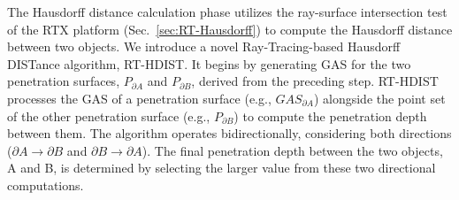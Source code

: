 The Hausdorff distance calculation phase utilizes the ray-surface intersection test of the RTX platform (Sec.~\ref{sec:RT-Hausdorff}) to compute the Hausdorff distance between two objects.
We introduce a novel Ray-Tracing-based Hausdorff DISTance algorithm, RT-HDIST.
It begins by generating GAS for the two penetration surfaces, $P_{\partial A}$ and $P_{\partial B}$, derived from the preceding step.
RT-HDIST processes the GAS of a penetration surface (e.g., $GAS_{\partial A}$) alongside the point set of the other penetration surface (e.g., $P_{\partial B}$) to compute the penetration depth between them.
The algorithm operates bidirectionally, considering both directions ($\partial A \to \partial B$ and $\partial B \to \partial A$).
The final penetration depth between the two objects, A and B, is determined by selecting the larger value from these two directional computations.




